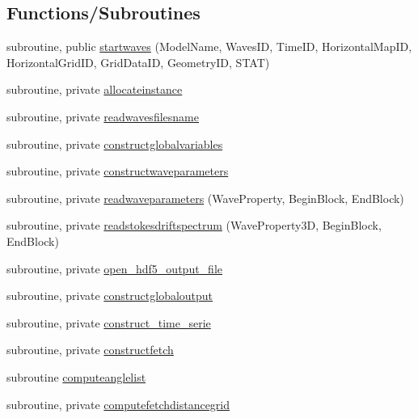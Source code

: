 \subsection*{Functions/\+Subroutines}
\begin{DoxyCompactItemize}
\item 
subroutine, public \mbox{\hyperlink{namespacemodulewaves_afb65a1617589473a3eac08eef0cc3a2b}{startwaves}} (Model\+Name, Waves\+ID, Time\+ID, Horizontal\+Map\+ID, Horizontal\+Grid\+ID, Grid\+Data\+ID, Geometry\+ID, S\+T\+AT)
\item 
subroutine, private \mbox{\hyperlink{namespacemodulewaves_a297c227bd5b05df6253e23b3cba4aaca}{allocateinstance}}
\item 
subroutine, private \mbox{\hyperlink{namespacemodulewaves_abfbc4de9c60ff461e62bcb11b5e7aad8}{readwavesfilesname}}
\item 
subroutine, private \mbox{\hyperlink{namespacemodulewaves_ad44cb14b28b28a735447792076b5f1f5}{constructglobalvariables}}
\item 
subroutine, private \mbox{\hyperlink{namespacemodulewaves_a41194554ad5f331ce92bbcc1ac85a374}{constructwaveparameters}}
\item 
subroutine, private \mbox{\hyperlink{namespacemodulewaves_a5465d7c0bebb4ccf791eba8d2dfb8a8d}{readwaveparameters}} (Wave\+Property, Begin\+Block, End\+Block)
\item 
subroutine, private \mbox{\hyperlink{namespacemodulewaves_a8f1215445f8fd38dbf41e7339b28cf9f}{readstokesdriftspectrum}} (Wave\+Property3D, Begin\+Block, End\+Block)
\item 
subroutine, private \mbox{\hyperlink{namespacemodulewaves_ad471c985c50cab76ec8f36df2211dc37}{open\+\_\+hdf5\+\_\+output\+\_\+file}}
\item 
subroutine, private \mbox{\hyperlink{namespacemodulewaves_a069825270a300a70ba32518f571bcb90}{constructglobaloutput}}
\item 
subroutine, private \mbox{\hyperlink{namespacemodulewaves_a86eae20876164ce3f5e09fbb27e80f64}{construct\+\_\+time\+\_\+serie}}
\item 
subroutine, private \mbox{\hyperlink{namespacemodulewaves_ae74bdf3f12b1f411d55edf56bb284dc1}{constructfetch}}
\item 
subroutine \mbox{\hyperlink{namespacemodulewaves_a87b9e4a4fb336f9ea383004f7732a8e5}{computeanglelist}}
\item 
subroutine, private \mbox{\hyperlink{namespacemodulewaves_a945cce4a681b204911670731bf66725a}{computefetchdistancegrid}}
\item 

\end{DoxyCompactItemize}
